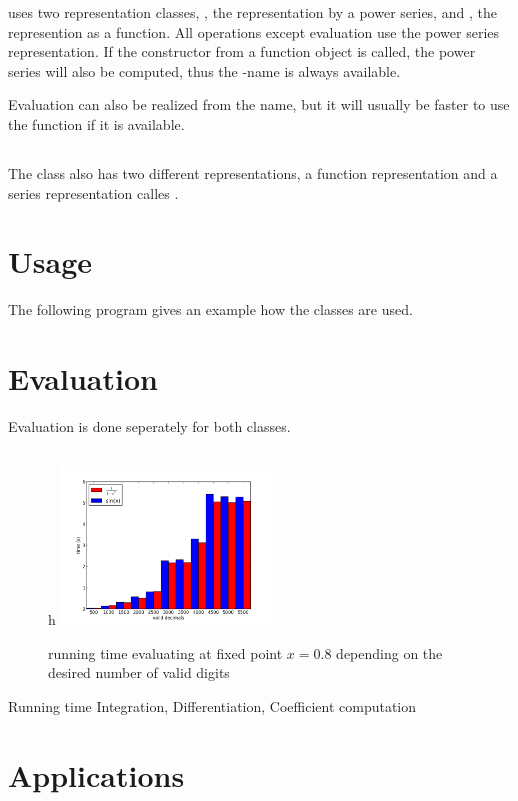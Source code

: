 		\baana uses two representation classes, , the representation by a power series, and , the represention as a function. 
		All operations except evaluation use the power series representation. 
		If the constructor from a function object is called, the power series will also be computed, 
		thus the -name is always available.

		Evaluation can also be realized from the  name, but it will usually be faster 
		to use the function if it is available.

	\subsection{\anarect}
		The class \textbf{\anarect} also has two different representations, 
		a function representation  and a series representation calles .
	\section{Usage}
		The following \cc program gives an example how the classes are used.
	\section{Evaluation}
		Evaluation is done seperately for both classes.
		\subsection{\baana}
			\begin{figure}{h}
				\centering
				\includegraphics[width=0.5\textwidth]{img/analytic/ba_ana_dep_on_n_bar.png}
				\caption{running time evaluating \baana at fixed point $x=0.8$ depending on the desired number of valid digits}
				\label{fig:ba_ana dep on n}
			\end{figure}
			Running time Integration, Differentiation, Coefficient computation 
		\subsection{\anarect}
	\section{Applications}